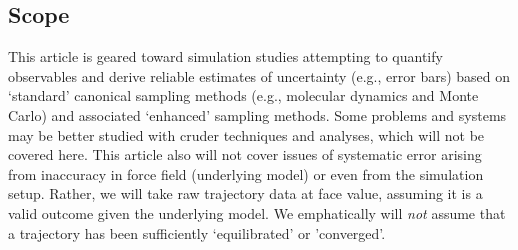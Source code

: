 \subsection{Scope}

This article is geared toward simulation studies attempting to quantify observables and derive reliable estimates of uncertainty (e.g., error bars) based on `standard' canonical sampling methods (e.g., molecular dynamics and Monte Carlo) and associated `enhanced' sampling methods.
Some problems and systems may be better studied with cruder techniques and analyses, which will not be covered here.
This article also will not cover issues of systematic error arising from inaccuracy in force field (underlying model) or even from the simulation setup.
Rather, we will take raw trajectory data at face value, assuming it is a valid outcome given the underlying model.
We emphatically will \emph{not} assume that a trajectory has been sufficiently `equilibrated' or 'converged'.